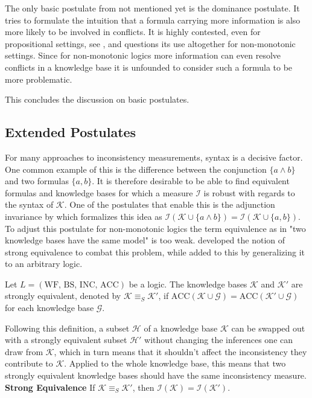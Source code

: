 The only basic postulate from \cite{hunter_measure_2010} not mentioned yet is the dominance postulate. It tries to formulate the intuition that a formula carrying more information is also more likely to be involved in conflicts. It is highly contested, even for propositional settings, see \cite{ferme_revisiting_2014}, and \cite{ulbricht_measuring_2018} questions its use altogether for non-monotonic settings. Since for non-monotonic logics more information can even resolve conflicts in a knowledge base it is unfounded to consider such a formula to be more problematic.

This concludes the discussion on basic postulates.

\subsection{Extended Postulates}
For many approaches to inconsistency measurements, syntax is a decisive factor. One common example of this is the difference between the conjunction \(\{a \land b\}\) and two formulas \(\{a, b\}\). It is therefore desirable to be able to find equivalent formulas and knowledge bases for which a measure \(\mathcal{I}\) is robust with regards to the syntax of \(\mathcal{K}\). One of the postulates that enable this is the adjunction invariance by \cite{ferme_revisiting_2014} which formalizes this idea as \(\mathcal{I}(\mathcal{K} \cup \{a \land b\}) = \mathcal{I}(\mathcal{K} \cup \{a, b\})\).
To adjust this postulate for non-monotonic logics the term equivalence as in "two knowledge bases have the same model" is too weak. \cite{lifschitz_strongly_2001} developed the notion of strong equivalence to combat this problem, while \cite{brewka_strong_2019} added to this by generalizing it to an arbitrary logic.

\begin{definition}
    Let \(L = (\text{WF, BS, INC, ACC})\) be a logic. The knowledge bases \(\mathcal{K}\) and \(\mathcal{K}'\) are strongly equivalent, denoted by \(\mathcal{K} \equiv_S  \mathcal{K}'\), if \(\text{ACC}(\mathcal{K} \cup \mathcal{G}) = \text{ACC}(\mathcal{K}' \cup \mathcal{G})\) for each knowledge base \(\mathcal{G}\).
\end{definition}

Following this definition, a subset \(\mathcal{H}\) of a knowledge base \(\mathcal{K}\) can be swapped out with a strongly equivalent subset \(\mathcal{H}'\) without changing the inferences one can draw from \(\mathcal{K}\), which in turn means that it shouldn't affect the inconsistency they contribute to \(\mathcal{K}\). Applied to the whole knowledge base, this means that two strongly equivalent knowledge bases should have the same inconsistency measure.
\\
\textbf{Strong Equivalence}
If \(\mathcal{K} \equiv_S \mathcal{K}'\), then \(\mathcal{I}(\mathcal{K}) = \mathcal{I}(\mathcal{K}')\).

